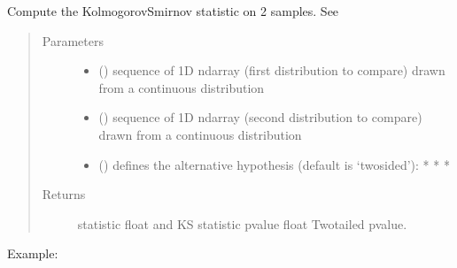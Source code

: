 \documentclass[letterpaper,10pt,english]{sphinxmanual}
\begin{document}
\begin{fulllineitems}
\label{\detokenize{_autosummary/analytics_core.analytics:analytics_core.analytics.analytics.run_kolmogorov_smirnov}}
Compute the Kolmogorov\sphinxhyphen{}Smirnov statistic on 2 samples. See 
\begin{quote}\begin{description}
\item[{Parameters}] \leavevmode\begin{itemize}
\item {} 
 () \textendash{} sequence of 1\sphinxhyphen{}D ndarray (first distribution to compare) drawn from a continuous distribution

\item {} 
 () \textendash{} sequence of 1\sphinxhyphen{}D ndarray (second distribution to compare) drawn from a continuous distribution

\item {} 
 () \textendash{} defines the alternative hypothesis (default is ‘two\sphinxhyphen{}sided’):
* 
* 
* 

\end{itemize}

\item[{Returns}] \leavevmode
statistic float and KS statistic pvalue float Two\sphinxhyphen{}tailed p\sphinxhyphen{}value.

\end{description}\end{quote}

Example:

\begin{sphinxVerbatim}[commandchars=\\\{\}]
    
\end{sphinxVerbatim}

\end{fulllineitems}
\end{document}
